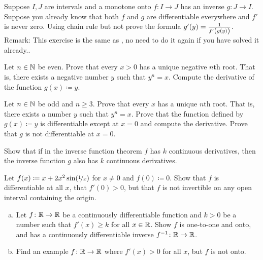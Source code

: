 \begin{exercise}
\pagebreak[2]
Suppose $I,J$ are intervals and a monotone onto $f \colon I \to J$ has an inverse $g \colon J \to I$.
Suppose you already know that both $f$ and $g$ are differentiable
everywhere and $f'$ is never zero.  Using chain rule but not  prove the
formula $g'(y) = \frac{1}{f'\left(\vphantom{1_1^1}g(y)\right)}$. %
Remark: This exercise is the same as ,
no need to do it again if you have
solved it already..
\end{exercise}

\begin{exercise}
\pagebreak[2]
Let $n\in {\mathbb{N}}$ be even.
Prove that every $x > 0$ has a unique negative $n$th root.
That is, there exists a negative number $y$ such that $y^n = x$.
Compute the derivative
of the function $g(x) \coloneqq y$.
\end{exercise}

\begin{exercise} \label{exercise:oddroot}
Let $n \in {\mathbb{N}}$ be odd and $n \geq 3$.
Prove that every $x$ has a unique $n$th root.
That is, there exists a number $y$ such that $y^n = x$.  Prove that
the function defined by $g(x) \coloneqq y$ is differentiable except at $x=0$
and compute the derivative.  Prove that $g$ is not differentiable at $x=0$.
\end{exercise}

\begin{exercise}
Show that if in the inverse function theorem $f$ has $k$ continuous
derivatives, then the inverse function $g$ also has $k$ continuous
derivatives.
\end{exercise}

\begin{exercise}
Let $f(x) \coloneqq x + 2 x^2 \sin(\nicefrac{1}{x})$ for $x \not= 0$ and
$f(0) \coloneqq 0$.  Show that $f$ is differentiable at all $x$, that $f'(0) > 0$,
but that $f$ is not invertible
on any open interval containing the origin.
\end{exercise}

\begin{exercise}
\leavevmode
\begin{enumerate}[a)]
\item
Let $f \colon {\mathbb{R}} \to {\mathbb{R}}$ be a continuously differentiable function
and $k > 0$ be a number such that $f'(x) \geq k$ for all $x \in {\mathbb{R}}$.
Show $f$ is one-to-one and onto, and has a continuously differentiable
inverse $f^{-1} \colon {\mathbb{R}} \to {\mathbb{R}}$.
\item
Find an example $f \colon {\mathbb{R}} \to {\mathbb{R}}$
where $f'(x) > 0$
for all $x$, but $f$ is not onto.
\end{enumerate}
\end{exercise}

